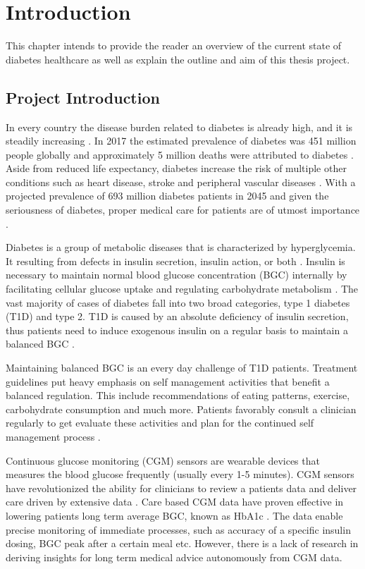 \chapter{Introduction}

This chapter intends to provide the reader an overview of the current state of diabetes healthcare as well as explain the outline and aim of this thesis project.

\section{Project Introduction}

In every country the disease burden related to diabetes is already high, and it is steadily increasing \parencite{Forouhi2014}.
In 2017 the estimated prevalence of diabetes was 451 million people globally and approximately 5 million deaths were attributed to diabetes \parencite{Cho2018}.
Aside from reduced life expectancy, diabetes increase the risk of multiple other conditions such as heart disease, stroke and peripheral vascular diseases \parencite{Forouhi2014}.
With a projected prevalence of 693 million diabetes patients in 2045 and given the seriousness of diabetes, proper medical care for patients are of utmost importance \parencite{Cho2018}.

Diabetes is a group of metabolic diseases that is characterized by hyperglycemia.
It resulting from defects in insulin secretion, insulin action, or both \parencite{ADA2010}.
Insulin is necessary to maintain normal blood glucose concentration (BGC) internally by facilitating cellular glucose uptake and regulating carbohydrate metabolism \parencite{Wilcox2005}.
The vast majority of cases of diabetes fall into two broad categories, type 1 diabetes (T1D) and type 2.
T1D is caused by an absolute deficiency of insulin secretion, thus patients need to induce exogenous insulin on a regular basis to maintain a balanced BGC \parencite{ADA2010}.

Maintaining balanced BGC is an every day challenge of T1D patients.
Treatment guidelines put heavy emphasis on self management activities that benefit a balanced regulation.
This include recommendations of eating patterns, exercise, carbohydrate consumption and much more.
Patients favorably consult a clinician regularly to get evaluate these activities and plan for the continued self management process \parencite{Cooke2013}.

Continuous glucose monitoring (CGM) sensors are wearable devices that measures the blood glucose frequently (usually every 1-5 minutes).
CGM sensors have revolutionized the ability for clinicians to review a patients data and deliver care driven by extensive data \parencite{Facchinetti2016}.
Care based CGM data have proven effective in lowering patients long term average BGC, known as HbA1c \parencite{dungan2018monitoring}.
The data enable precise monitoring of immediate processes, such as accuracy of a specific insulin dosing, BGC peak after a certain meal etc.
However, there is a lack of research in deriving insights for long term medical advice autonomously from CGM data.

